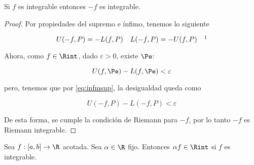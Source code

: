 \begin{teo}
    Si $f$ es integrable entonces $-f$ es integrable.
\end{teo}

\begin{proof}
    Por propiedades del supremo e ínfimo, tenemos lo siguiente
    
    \begin{equation}\label{eq:infmsup}
    U(-f, P) = -L(f, P) \quad L(-f, P) = -U(f, P) \quad \footnotemark
    \end{equation}
    
    Ahora, como $f \in \Rint$, dado $\varepsilon > 0$, existe $\Pe$:
    
    \[
    U(f, \Pe) - L(f, \Pe) < \varepsilon
    \]
    
    \noindent pero, tenemos que por \ref{eq:infmsup}, la desigualdad queda como
    
    \[
    U(-f, P) - L(-f, P) < \varepsilon
    \]
    
    De esta forma, se cumple la condición de Riemann para $-f$, por lo tanto $-f$ es Riemann integrable.
\end{proof}

\begin{teo}
    Sea $f: [a,b] \rightarrow \R$ acotada. Sea $\alpha \in \R$ fijo. Entonces $\alpha f \in \Rint$ si $f$ es integrable.
\end{teo}

